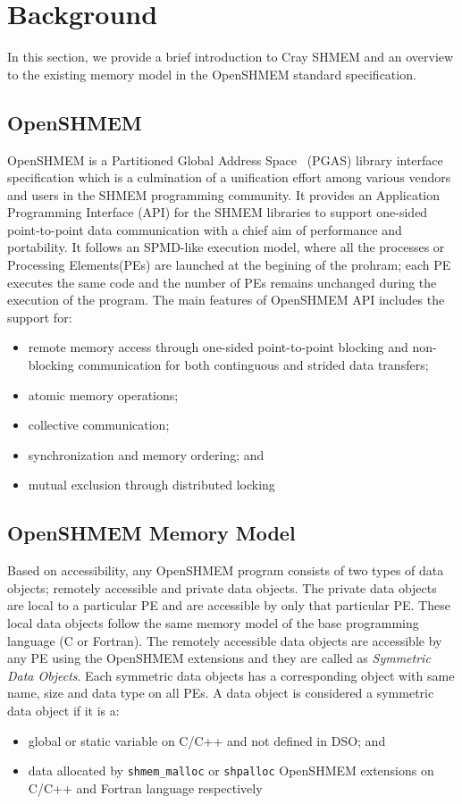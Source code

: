 \section{Background}
\label{src:bground}

In this section, we provide a brief introduction to Cray SHMEM and an
overview to the existing memory model in the OpenSHMEM standard
specification.

\subsection{OpenSHMEM}
\label{src:bg/osm}
OpenSHMEM is a Partitioned Global Address Space~\cite{pgas} (PGAS) library
interface specification which is a culmination of a unification effort
among various vendors and users in the SHMEM programming community. It
provides an Application Programming Interface (API) for the SHMEM libraries
to support one-sided point-to-point data communication with a chief aim of
performance and portability. It follows an SPMD-like execution model, where
all the processes or Processing Elements(PEs) are launched at the begining
of the prohram; each PE executes the same code and the number of PEs remains
unchanged during the execution of the program. The main features of OpenSHMEM
API includes the support for:
\begin{itemize}
    \item remote memory access through one-sided point-to-point blocking and
    non-blocking communication for both continguous and strided data transfers;
    \item atomic memory operations;
    \item collective communication;
    \item synchronization and memory ordering; and
    \item mutual exclusion through distributed locking
\end{itemize}

\subsection{OpenSHMEM Memory Model}
\label{src:bg/mmodel}
Based on accessibility, any OpenSHMEM program consists of two types of data
objects; remotely accessible and private data objects. The private data objects
are local to a particular PE and are accessible by only that particular PE.
These local data objects follow the same memory model of the base programming
language (C or Fortran). The remotely accessible data objects are accessible
by any PE using the OpenSHMEM extensions and they are called as \emph{Symmetric
Data Objects}. Each symmetric data objects has a corresponding object with same
name, size and data type on all PEs. A data object is considered a symmetric
data object if it is a:
\begin{itemize}
    \item global or static variable on C/C++ and not defined in DSO; and
    \item data allocated by \texttt{shmem\_malloc} or \texttt{shpalloc}
    OpenSHMEM extensions on C/C++ and Fortran language respectively
\end{itemize}

